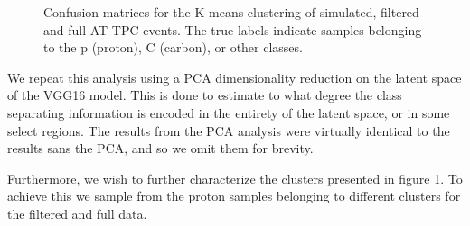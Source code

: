 \begin{figure}
\centering

	\hspace{-1cm}
	\hspace{-1cm}
\caption[Pre-trained network - confusion matrices]{Confusion matrices for the K-means clustering of simulated, filtered and full AT-TPC events. The true labels indicate samples belonging to the p (proton), C (carbon), or other classes. }\label{fig:clster_confmat}
\end{figure}

We repeat this analysis using a PCA dimensionality reduction on the latent space of the VGG16 model. This is done to estimate to what degree the class separating information is encoded in the entirety of the latent space, or in some select regions. The results from the PCA analysis were virtually identical to the results sans the PCA, and so we omit them for brevity. 

Furthermore, we wish to further characterize the clusters presented in figure \ref{fig:clster_confmat}. To achieve this we sample from the proton samples belonging to different clusters for the filtered and full data.

